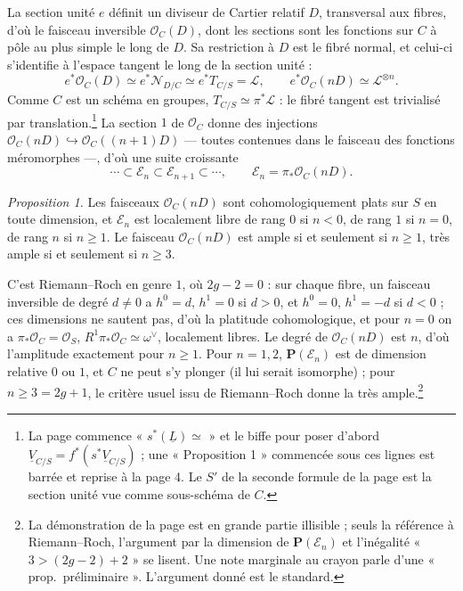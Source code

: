 \documentclass[11pt,a4paper]{article}
\begin{document}
La section unité $e$ définit un diviseur de Cartier relatif $D$, transversal
aux fibres, d'où le faisceau inversible $\mathcal{O}_C(D)$, dont les sections
sont les fonctions sur $C$ à pôle au plus simple le long de $D$. Sa restriction
à $D$ est le fibré normal, et celui-ci s'identifie à l'espace tangent le long
de la section unité :
\[
e^*\mathcal{O}_C(D) \simeq e^*\mathcal{N}_{D/C} \simeq e^*T_{C/S} =
\mathcal{L},
\qquad
e^*\mathcal{O}_C(nD) \simeq \mathcal{L}^{\otimes n}.
\]
Comme $C$ est un schéma en groupes, $T_{C/S} \simeq \pi^*\mathcal{L}$ : le
fibré tangent est trivialisé par translation.\footnote{La page commence
« $s^*(\underline{L}) \simeq$ » et le biffe pour poser d'abord $\underline{V}_{C/S}
= f^*(s^*\underline{V}_{C/S})$ ; une « Proposition 1 » commencée sous ces lignes est
barrée et reprise à la page 4. Le $S'$ de la seconde formule de la page est la
section unité vue comme sous-schéma de $C$.} La section $1$ de
$\mathcal{O}_C$ donne des injections $\mathcal{O}_C(nD) \hookrightarrow
\mathcal{O}_C((n+1)D)$ --- toutes contenues dans le faisceau des fonctions
méromorphes ---, d'où une suite croissante
\[
\cdots \subset \mathcal{E}_n \subset \mathcal{E}_{n+1} \subset \cdots,
\qquad \mathcal{E}_n = \pi_*\mathcal{O}_C(nD).
\]

\emph{Proposition 1.} Les faisceaux $\mathcal{O}_C(nD)$ sont
cohomologiquement plats sur $S$ en toute dimension, et
$\mathcal{E}_n$ est localement libre de rang $0$ si $n < 0$, de rang $1$ si
$n = 0$, de rang $n$ si $n \geqslant 1$. Le faisceau $\mathcal{O}_C(nD)$ est
ample si et seulement si $n \geqslant 1$, très ample si et seulement si $n
\geqslant 3$.

C'est Riemann--Roch en genre $1$, où $2g - 2 = 0$ : sur chaque fibre, un
faisceau inversible de degré $d \neq 0$ a $h^0 = d$, $h^1 = 0$ si $d > 0$, et
$h^0 = 0$, $h^1 = -d$ si $d < 0$ ; ces dimensions ne sautent pas, d'où la
platitude cohomologique, et pour $n = 0$ on a $\pi_*\mathcal{O}_C =
\mathcal{O}_S$, $R^1\pi_*\mathcal{O}_C \simeq \omega^\vee$, localement libres.
Le degré de $\mathcal{O}_C(nD)$ est $n$, d'où l'amplitude exactement pour $n
\geqslant 1$. Pour $n = 1, 2$, $\mathbf{P}(\mathcal{E}_n)$ est de dimension
relative $0$ ou $1$, et $C$ ne peut s'y plonger (il lui serait isomorphe) ;
pour $n \geqslant 3 = 2g + 1$, le critère usuel issu de Riemann--Roch donne la
très ample.\footnote{La démonstration de la page est en grande partie
illisible ; seuls la référence à Riemann--Roch, l'argument par la dimension de
$\mathbf{P}(\mathcal{E}_n)$ et l'inégalité « $3 > (2g-2)+2$ » se lisent. Une
note marginale au crayon parle d'une « prop.\ préliminaire ». L'argument
donné est le standard.}
\end{document}
